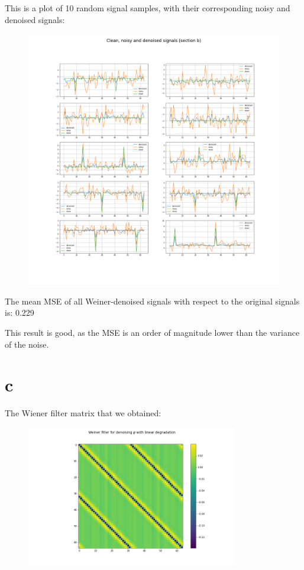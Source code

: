 \documentclass[a4paper]{article}
\begin{document}
\newpage 

This is a plot of 10 random signal samples, with their corresponding noisy and denoised signals:

\begin{figure}[h]
    \centering
    \includegraphics[width=500,keepaspectratio]{samples_b.png}
\end{figure}

The mean MSE of all Weiner-denoised signals with respect to the original signals is: 0.229

This result is good, as the MSE is an order of magnitude lower than the variance of the noise.

\newpage

\section*{c}

The Wiener filter matrix that we obtained:

\begin{figure}[h]
    \centering
    \includegraphics[width=350,keepaspectratio]{p2q1c_weiner.png}
\end{figure}
\end{document}
